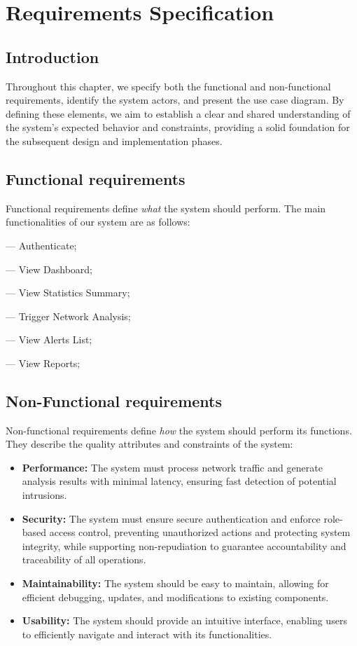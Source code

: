 \chapter{Requirements Specification}

\section{Introduction}
Throughout this chapter, we specify both the functional and non-functional requirements, identify the system actors, and present the use case diagram.
By defining these elements, we aim to establish a clear and shared understanding of the system’s expected behavior and constraints, providing a solid foundation for the subsequent design and implementation phases.

\section{Functional requirements}
Functional requirements define \emph{what} the system should perform. The main functionalities of our system are as follows:

— Authenticate;

— View Dashboard;

— View Statistics Summary;

— Trigger Network Analysis;

— View Alerts List;

— View Reports;

\section{Non-Functional requirements}

Non-functional requirements define \emph{how} the system should perform its functions. They describe the quality attributes and constraints of the system:
\begin{itemize}
    \item \textbf{Performance:} The system must process network traffic and generate analysis results with minimal latency, ensuring fast detection of potential intrusions.
    \item \textbf{Security:} The system must ensure secure authentication and enforce role-based access control, preventing unauthorized actions and protecting system integrity, while supporting non-repudiation to guarantee accountability and traceability of all operations.
    \item \textbf{Maintainability:} The system should be easy to maintain, allowing for efficient debugging, updates, and modifications to existing components.
    \item \textbf{Usability:} The system should provide an intuitive interface, enabling users to efficiently navigate and interact with its functionalities.
\end{itemize}

